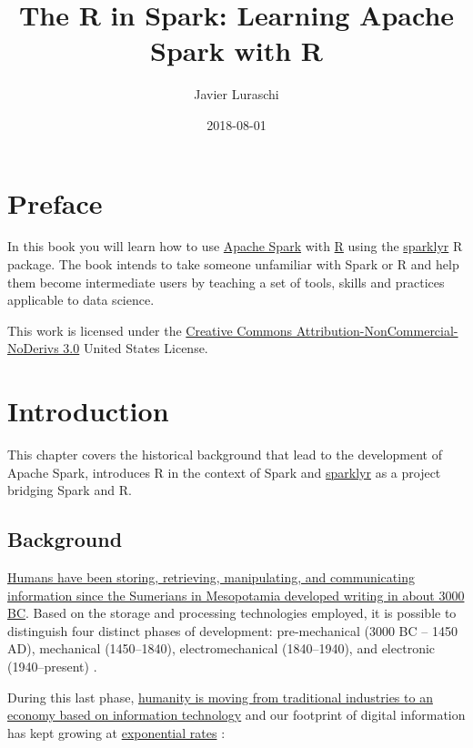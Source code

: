 \documentclass[]{book}
\title{The R in Spark: Learning Apache Spark with R}
\author{Javier Luraschi}
\date{2018-08-01}
\theoremstyle{definition}
\theoremstyle{definition}
\theoremstyle{definition}
\theoremstyle{remark}
\begin{document}
\maketitle

{
\setcounter{tocdepth}{1}
\tableofcontents
}
\hypertarget{preface}{%
\chapter*{Preface}\label{preface}}

In this book you will learn how to use
\href{https://spark.apache.org}{Apache Spark} with
\href{http://www.r-project.org/}{R} using the
\href{https://github.com/rstudio/sparklyr}{sparklyr} R package. The book
intends to take someone unfamiliar with Spark or R and help them become
intermediate users by teaching a set of tools, skills and practices
applicable to data science.

This work is licensed under the
\href{http://creativecommons.org/licenses/by-nc-nd/3.0/us/}{Creative
Commons Attribution-NonCommercial-NoDerivs 3.0} United States License.

\hypertarget{intro}{%
\chapter{Introduction}\label{intro}}

This chapter covers the historical background that lead to the
development of Apache Spark, introduces R in the context of Spark and
\href{https://github.com/rstudio/sparklyr}{sparklyr} as a project
bridging Spark and R.

\hypertarget{background}{%
\section{Background}\label{background}}

\href{https://en.wikipedia.org/wiki/Information_technology}{Humans have
been storing, retrieving, manipulating, and communicating information
since the Sumerians in Mesopotamia developed writing in about 3000 BC}.
Based on the storage and processing technologies employed, it is
possible to distinguish four distinct phases of development:
pre-mechanical (3000 BC -- 1450 AD), mechanical (1450--1840),
electromechanical (1840--1940), and electronic (1940--present)
\citep{information-technology}.

During this last phase,
\href{https://en.wikipedia.org/wiki/Information_Age}{humanity is moving
from traditional industries to an economy based on information
technology} and our footprint of digital information has kept growing at
\protect\hyperlink{storage-capacity}{exponential rates}
\citep{data-revolution}:
\end{document}
